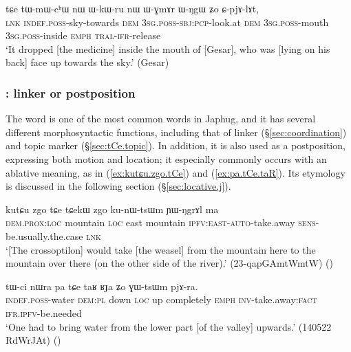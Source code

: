 \begin{exe}
\ex \label{ex:tWmWchW} 
\gll tɕe tɯ-mɯ-cʰɯ nɯ ɯ-kɯ-ru nɯ ɯ-ɣmɤr ɯ-ŋgɯ ʑo ɕ-pjɤ-lɤt, \\
\textsc{lnk} \textsc{indef}.\textsc{poss}-sky-towards \textsc{dem} \textsc{3sg}.\textsc{poss}-\textsc{sbj}:\textsc{pcp}-look.at \textsc{dem} \textsc{3sg}.\textsc{poss}-mouth \textsc{3sg}.\textsc{poss}-inside \textsc{emph} \textsc{tral}-\textsc{ifr}-release \\
\glt `It dropped [the medicine] inside the mouth of [Gesar], who was [lying on his back] face up towards the sky.' (Gesar)
\end{exe}

\subsubsection{: linker or postposition} \label{sec:tCe.postposition}
The word  is one of the most common words in Japhug, and it has several different morphosyntactic functions, including that of linker (§\ref{sec:coordination}) and topic marker (§\ref{sec:tCe.topic}). In addition, it is also used as a postposition, expressing both motion and location; it especially commonly occurs with an ablative meaning, as in (\ref{ex:kutɕu.zgo.tCe}) and (\ref{ex:pa.tCe.taR}). Its etymology is discussed in the following section (§\ref{sec:locative.j}).

\begin{exe}
\ex \label{ex:kutɕu.zgo.tCe}
\gll kutɕu zgo tɕe tɕekɯ zgo ku-nɯ-tsɯm ɲɯ-ŋgrɤl ma \\
\textsc{dem}.\textsc{prox}:\textsc{loc} mountain \textsc{loc} east mountain \textsc{ipfv}:\textsc{east}-\textsc{auto}-take.away \textsc{sens}-be.usually.the.case \textsc{lnk} \\
\glt `[The crossoptilon] would take [the weasel] from the mountain here to the mountain over there (on the other side of the river).' (23-qapGAmtWmtW) ()
\end{exe}

\begin{exe}
\ex \label{ex:pa.tCe.taR}
\gll tɯ-ci nɯra pa tɕe taʁ ʁɟa ʑo ɣɯ-tsɯm pjɤ-ra. \\
\textsc{indef}.\textsc{poss}-water \textsc{dem}:\textsc{pl} down \textsc{loc} up completely \textsc{emph} \textsc{inv}-take.away:\textsc{fact} \textsc{ifr}.\textsc{ipfv}-be.needed \\
\glt `One had to bring water from the lower part [of the valley] upwards.' (140522 RdWrJAt)
()
\end{exe}

